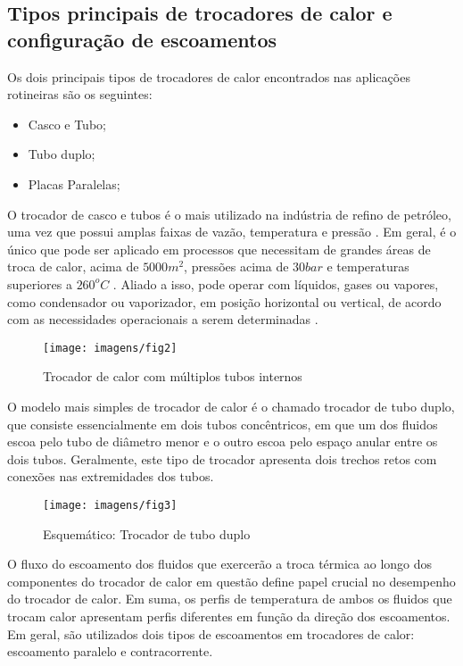 \subsection{Tipos principais de trocadores de calor e configuração de escoamentos}
Os dois principais tipos de trocadores de calor encontrados nas aplicações rotineiras são os seguintes:
\begin{itemize}
	\item Casco e Tubo;
	\item Tubo duplo;
	\item Placas Paralelas;
\end{itemize}

O trocador de casco e tubos é o mais utilizado na indústria de refino de petróleo, uma vez que possui amplas faixas de vazão, temperatura e pressão \cite{orgeda_2020_trocadores}. Em geral, é o único que pode ser aplicado em processos que necessitam de grandes áreas de troca de calor, acima de \(5000m^2\), pressões acima de \(30bar\) e temperaturas superiores a \(260^oC\) \cite{orgeda_2020_trocadores}. Aliado a isso, pode operar com líquidos, gases ou vapores, como condensador ou vaporizador, em posição horizontal ou vertical, de acordo com as necessidades operacionais a serem determinadas \cite{orgeda_2020_trocadores}. 

\begin{figure}[h]
	\centering
	\caption{Trocador de calor com múltiplos tubos internos}
	\label{fig:fig2}
	\texttt{[image: imagens/fig2]}
	
\end{figure}
O modelo mais simples de trocador de calor é o chamado trocador de tubo duplo, que consiste essencialmente em dois tubos concêntricos, em que um dos fluidos escoa pelo tubo de diâmetro menor e o outro escoa pelo espaço anular entre os dois tubos. Geralmente, este tipo de trocador apresenta dois trechos retos com conexões nas extremidades dos tubos.

\begin{figure}[h]
	\centering
	\caption{Esquemático: Trocador de tubo duplo}
	\label{fig:fig3}
	\texttt{[image: imagens/fig3]}
	
\end{figure}

O fluxo do escoamento dos fluidos que exercerão a troca térmica ao longo dos componentes do trocador de calor em questão define papel crucial no desempenho do trocador de calor. Em suma, os perfis de temperatura de ambos os fluidos que trocam calor apresentam perfis diferentes em função da direção dos escoamentos. Em geral, são utilizados dois tipos de escoamentos em trocadores de calor: escoamento paralelo e contracorrente.

